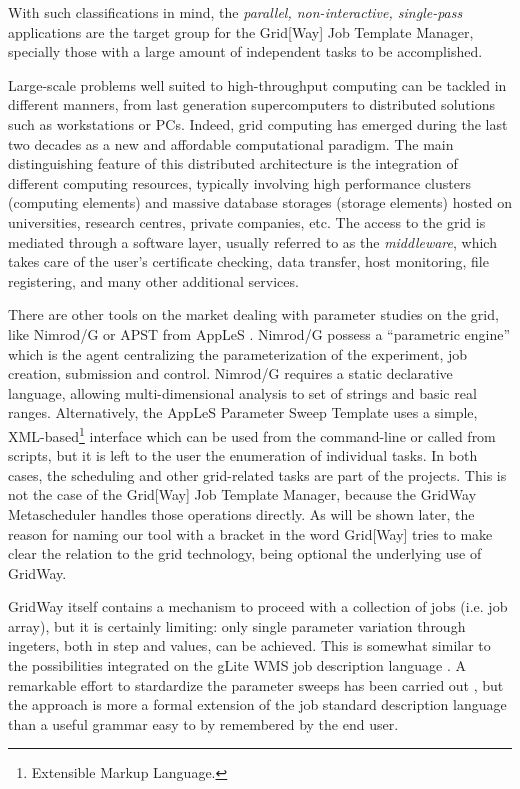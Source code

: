 \documentclass[12pt,a4paper]{article}
\begin{document}
With such classifications in mind, the {\em parallel, non-interactive, single-pass} applications are the target group for the Grid[Way] Job Template Manager, specially those with a large amount of independent tasks to be accomplished.

Large-scale problems well suited to high-throughput computing can be tackled in different manners, from last generation supercomputers to distributed solutions such as workstations or PCs. Indeed, grid computing has emerged during the last two decades as a new and affordable computational paradigm. The main distinguishing feature of this distributed architecture is the integration of different computing resources, typically involving high performance clusters (computing elements) and massive database storages (storage elements) hosted on universities, research centres, private companies, etc. The access to the grid is mediated through a software layer, usually referred to as the {\em middleware}, which takes care of the user's certificate checking, data transfer, host monitoring, file registering, and many other additional services.

There are other tools on the market dealing with parameter studies on the grid, like Nimrod/G \cite{Abramson:2000} or APST\cite{Casanova:2003} from AppLeS \cite{Casanova:2000}. Nimrod/G possess a ``parametric engine'' which is the agent centralizing the parameterization of the experiment, job creation, submission and control. Nimrod/G requires a static declarative language, allowing multi-dimensional analysis to set of strings and basic real ranges. Alternatively, the AppLeS Parameter Sweep Template uses a simple, XML-based\footnote{Extensible Markup Language.} interface which can be used from the command-line or called from scripts, but it is left to the user the enumeration of individual tasks. In both cases, the scheduling and other grid-related tasks are part of the projects. This is not the case of the Grid[Way] Job Template Manager, because the GridWay Metascheduler handles those operations directly.  As will be shown later, the reason for naming our tool with a bracket in the word Grid[Way] tries to make clear the relation to the grid technology, being optional the underlying use of GridWay.

GridWay itself contains a mechanism to proceed with a collection of jobs (i.e. job array)\cite{Huedo:2004}, but it is certainly limiting: only single parameter variation through ingeters, both in step and values, can be achieved. This is somewhat similar to the possibilities integrated on the gLite WMS job description language \cite{JDL}. A remarkable effort to stardardize the parameter sweeps has been carried out \cite{JSDL}, but the approach is more a formal extension of the job standard description language than a useful grammar easy to by remembered by the end user.
\end{document}
